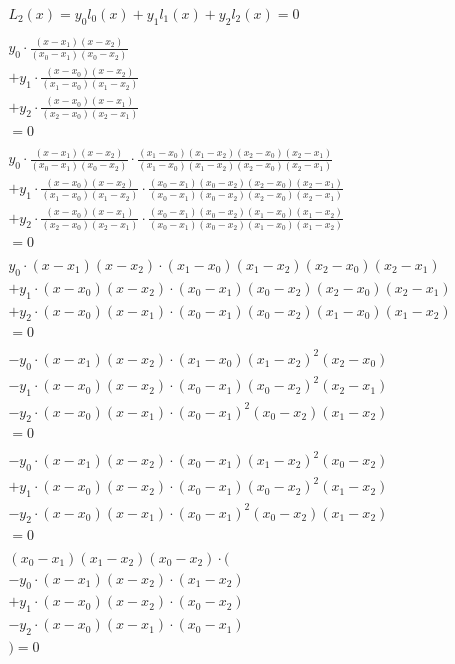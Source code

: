 \documentclass[a4paper]{article}
\begin{document}
\begin{align*}
    L_2(x) = y_0l_0(x) + y_1l_1(x) + y_2l_2(x) = 0 \\
    \\
    y_0 \cdot \frac{(x - x_1)(x - x_2)}{(x_0 - x_1)(x_0 - x_2)} \\
    + y_1 \cdot \frac{(x - x_0)(x - x_2)}{(x_1 - x_0)(x_1 - x_2)} \\
    + y_2 \cdot \frac{(x - x_0)(x - x_1)}{(x_2 - x_0)(x_2 - x_1)} \\
    = 0 \\
    \\
    y_0 \cdot \frac{(x - x_1)(x - x_2)}{(x_0 - x_1)(x_0 - x_2)} \cdot \frac{(x_1 - x_0)(x_1 - x_2)(x_2 - x_0)(x_2 - x_1)}{(x_1 - x_0)(x_1 - x_2)(x_2 - x_0)(x_2 - x_1)} \\
    + y_1 \cdot \frac{(x - x_0)(x - x_2)}{(x_1 - x_0)(x_1 - x_2)} \cdot \frac{(x_0 - x_1)(x_0 - x_2)(x_2 - x_0)(x_2 - x_1)}{(x_0 - x_1)(x_0 - x_2)(x_2 - x_0)(x_2 - x_1)} \\
    + y_2 \cdot \frac{(x - x_0)(x - x_1)}{(x_2 - x_0)(x_2 - x_1)} \cdot \frac{(x_0 - x_1)(x_0 - x_2)(x_1 - x_0)(x_1 - x_2)}{(x_0 - x_1)(x_0 - x_2)(x_1 - x_0)(x_1 - x_2)} \\
    = 0 \\
    \\
    y_0 \cdot (x - x_1)(x - x_2) \cdot (x_1 - x_0)(x_1 - x_2)(x_2 - x_0)(x_2 - x_1) \\
    + y_1 \cdot (x - x_0)(x - x_2) \cdot (x_0 - x_1)(x_0 - x_2)(x_2 - x_0)(x_2 - x_1) \\
    + y_2 \cdot (x - x_0)(x - x_1) \cdot (x_0 - x_1)(x_0 - x_2)(x_1 - x_0)(x_1 - x_2) \\
    = 0 \\
    \\
    - y_0 \cdot (x - x_1)(x - x_2) \cdot (x_1 - x_0)(x_1 - x_2)^2(x_2 - x_0) \\
    - y_1 \cdot (x - x_0)(x - x_2) \cdot (x_0 - x_1)(x_0 - x_2)^2(x_2 - x_1) \\
    - y_2 \cdot (x - x_0)(x - x_1) \cdot (x_0 - x_1)^2(x_0 - x_2)(x_1 - x_2) \\
    = 0 \\
    \\
    - y_0 \cdot (x - x_1)(x - x_2) \cdot (x_0 - x_1)(x_1 - x_2)^2(x_0 - x_2) \\
    + y_1 \cdot (x - x_0)(x - x_2) \cdot (x_0 - x_1)(x_0 - x_2)^2(x_1 - x_2) \\
    - y_2 \cdot (x - x_0)(x - x_1) \cdot (x_0 - x_1)^2(x_0 - x_2)(x_1 - x_2) \\
    = 0 \\
    \\
    (x_0 - x_1)(x_1 - x_2)(x_0 - x_2) \cdot \big( \\
        - y_0 \cdot (x - x_1)(x - x_2) \cdot (x_1 - x_2) \\
        + y_1 \cdot (x - x_0)(x - x_2) \cdot (x_0 - x_2) \\
        - y_2 \cdot (x - x_0)(x - x_1) \cdot (x_0 - x_1) \\
    \big) = 0
\end{align*}
\end{document}
